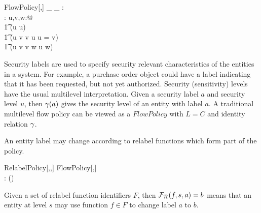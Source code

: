 \begin{schema}{FlowPolicy[\LEVEL,\LABEL]}
\_ \fleq \_ : \LEVEL \rel \LEVEL\\
\lev : \LABEL \fun \LEVEL 
\where
\forall u,v,w:\LEVEL @ \\
\t1 (u \fleq u) \land \\
\t1 (u \fleq v \land v \fleq u \implies u = v) \land \\
\t1 (u \fleq v \land v \fleq w \implies u \fleq w)
\end{schema}
Security labels are used to specify security relevant characteristics
of the entities in a system. For example, a purchase order object could
have a label indicating that it has been requested, but not yet
authorized. 
Security (sensitivity) levels have the usual multilevel
interpretation. 
Given a security label $a$ and security level $u$,
then $\gamma(a)$ gives the security level of an entity with
label $a$. 
A traditional multilevel flow policy can be viewed as a $FlowPolicy$
with $L=C$ and identity relation $\gamma$. 

An entity label may change according to relabel functions which form
part of the policy.
\begin{schema}{RelabelPolicy[\LEVEL,\LABEL,\FID]}
FlowPolicy[\LEVEL,\LABEL]\\
\Rfun : (\FID \cross \LEVEL \cross \LABEL) \fun \LABEL
\end{schema}
Given a set of relabel function identifiers $F$, then 
$\mbox{$\cal F_{R}$}(f,s,a)=b$ means that an entity at level $s$ may 
use function $f\in F$ to change label $a$ to $b$. 

